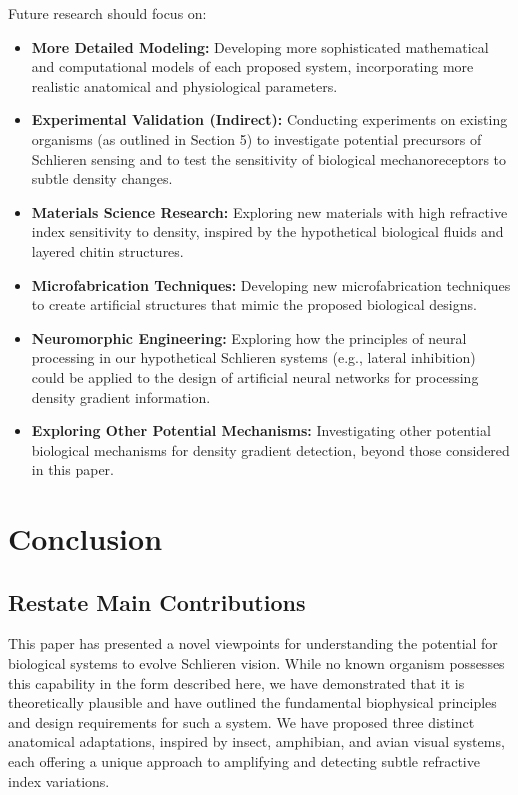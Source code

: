 \documentclass[11pt]{article}
\begin{document}
Future research should focus on:
\begin{itemize}
    \item \textbf{More Detailed Modeling:} Developing more sophisticated mathematical and computational models of each proposed system, incorporating more realistic anatomical and physiological parameters.
    \item \textbf{Experimental Validation (Indirect):} Conducting experiments on existing organisms (as outlined in Section 5) to investigate potential precursors of Schlieren sensing and to test the sensitivity of biological mechanoreceptors to subtle density changes.
    \item \textbf{Materials Science Research:} Exploring new materials with high refractive index sensitivity to density, inspired by the hypothetical biological fluids and layered chitin structures.
    \item \textbf{Microfabrication Techniques:} Developing new microfabrication techniques to create artificial structures that mimic the proposed biological designs.
    \item \textbf{Neuromorphic Engineering:} Exploring how the principles of neural processing in our hypothetical Schlieren systems (e.g., lateral inhibition) could be applied to the design of artificial neural networks for processing density gradient information.
    \item \textbf{Exploring Other Potential Mechanisms:} Investigating other potential biological mechanisms for density gradient detection, beyond those considered in this paper.
\end{itemize}

\section{Conclusion}

\subsection{Restate Main Contributions}

This paper has presented a novel viewpoints for understanding the potential for biological systems to evolve Schlieren vision. While no known organism possesses this capability in the form described here, we have demonstrated that it is theoretically plausible and have outlined the fundamental biophysical principles and design requirements for such a system. We have proposed three distinct anatomical adaptations, inspired by insect, amphibian, and avian visual systems, each offering a unique approach to amplifying and detecting subtle refractive index variations.
\end{document}
